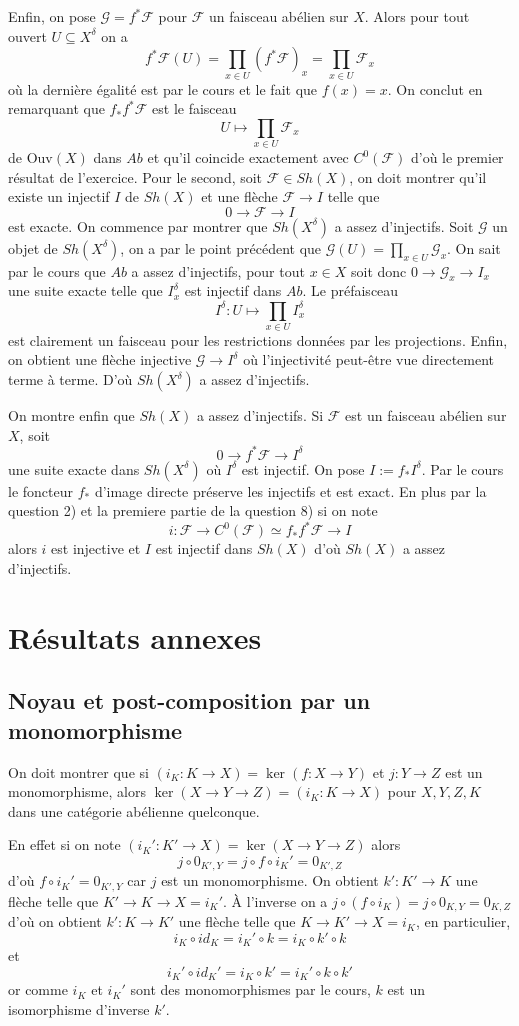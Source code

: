 \documentclass[a4paper,12pt]{article}
\newcommand{\F}{\mathscr F}
\newcommand{\Ouv}{\textrm{Ouv}}
\newcommand{\G}{\mathscr{G}}
\theoremstyle{plain}
\theoremstyle{definition}
\theoremstyle{remark}
\begin{document}
Enfin, on pose
$\G=f^*\F$ pour $\F$ un faisceau abélien sur $X$. Alors pour tout
ouvert $U\subseteq X^\delta$ on a 
\[f^*\F(U)=\prod_{x\in U} (f^*\F)_x = \prod_{x\in U} \F_x\]
où la dernière égalité est par le cours et le fait que $f(x)=x$. On 
conclut en remarquant que $f_*f^*\F$ est le faisceau 
\[U\mapsto \prod_{x\in U}\F_x\]
de $\Ouv(X)$ dans $Ab$ et qu'il coincide exactement avec $C^0(\F)$ d'où
le premier résultat de l'exercice.
\newline
Pour le second, soit $\F\in Sh(X)$, on doit montrer qu'il existe
un injectif $I$ de $Sh(X)$ et une flèche $\F\to I$ telle que 
\[0\to \F\to I\]
est exacte. On commence par montrer que $Sh(X^\delta)$ a assez
d'injectifs. Soit $\G$ un objet de $Sh(X^\delta)$, on a par le 
point précédent que $\G(U)=\prod_{x\in U}\G_x$. On sait par le
cours que $Ab$ a assez d'injectifs, pour tout $x\in X$ soit donc
$0\to \G_x\to I_x$ une suite exacte telle que $I^\delta_x$ est injectif
dans $Ab$. Le préfaisceau \[I^\delta\colon U\mapsto \prod_{x\in U}
I^\delta_x\]
est clairement un faisceau pour les restrictions données par les
projections. Enfin, on obtient une flèche injective $\G\to I^\delta$
où l'injectivité peut-être vue directement terme à terme. D'où
$Sh(X^\delta)$ a assez d'injectifs.
\newline

On montre enfin que $Sh(X)$ a assez d'injectifs. Si 
$\F$ est un faisceau abélien sur $X$, soit 
\[0\to f^*\F\to I^\delta\]
une suite exacte dans $Sh(X^\delta)$ où $I^\delta$ est injectif. On
pose $I:=f_* I^\delta$. Par le cours le foncteur $f_*$ d'image directe
préserve les injectifs et est exact. En plus par la question 2) et 
la premiere partie de la question 8) si on note 
\[i\colon \F\to C^0(\F)\simeq f_*f^*\F \to I\]
alors $i$ est injective et $I$ est injectif dans $Sh(X)$ d'où
$Sh(X)$ a assez d'injectifs.


\section{Résultats annexes}
\subsection{Noyau et post-composition par un monomorphisme}
On doit montrer que si
$(i_K\colon K\to X)=\ker(f\colon X\to Y)$ et $j\colon Y\to Z$ est un
monomorphisme, alors $\ker(X\to Y\to Z)=(i_K\colon K\to X)$ pour 
$X,Y,Z,K$ dans une catégorie abélienne quelconque.

En effet si on note $(i_K'\colon K'\to X) =\ker(X\to Y\to Z)$ alors 
\[j\circ 0_{K',Y}=j\circ f\circ i_K'=0_{K',Z}\]
d'où $f\circ i_K'=0_{K',Y}$ car $j$ est un monomorphisme. On obtient
$k'\colon K'\to K$ une flèche telle que $K'\to K\to X=i_K'$.
À l'inverse on a $j\circ (f\circ i_K)=j\circ 0_{K, Y}=0_{K, Z}$ d'où 
on obtient $k'\colon K\to K'$ une flèche telle que $K\to K'\to X=i_K$,
en particulier, \[i_K\circ id_K=i_K'\circ k=i_K\circ k'\circ k\] et 
\[i_K'\circ id_K'=i_K\circ k'=i_K'\circ k\circ k'\]
or comme $i_K$ et $i_K'$ sont des monomorphismes
par le cours, $k$ est un isomorphisme d'inverse $k'$. 
\end{document}
